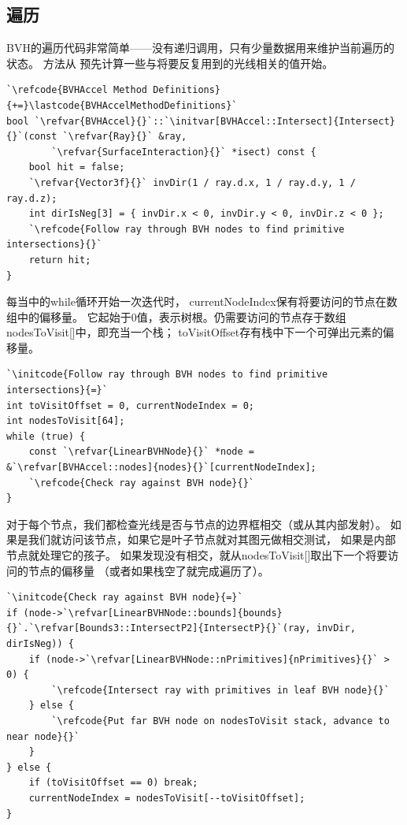 \subsection{遍历}\label{sub:遍历}
BVH的遍历代码非常简单——没有递归调用，只有少量数据用来维护当前遍历的状态。
方法从
预先计算一些与将要反复用到的光线相关的值开始。
\begin{lstlisting}
`\refcode{BVHAccel Method Definitions}{+=}\lastcode{BVHAccelMethodDefinitions}`
bool `\refvar{BVHAccel}{}`::`\initvar[BVHAccel::Intersect]{Intersect}{}`(const `\refvar{Ray}{}` &ray,
        `\refvar{SurfaceInteraction}{}` *isect) const {
    bool hit = false;
    `\refvar{Vector3f}{}` invDir(1 / ray.d.x, 1 / ray.d.y, 1 / ray.d.z);
    int dirIsNeg[3] = { invDir.x < 0, invDir.y < 0, invDir.z < 0 };
    `\refcode{Follow ray through BVH nodes to find primitive intersections}{}`
    return hit;
}
\end{lstlisting}

每当中的{\ttfamily while}循环开始一次迭代时，
{\ttfamily currentNodeIndex}保有将要访问的节点在数组中的偏移量。
它起始于0值，表示树根。仍需要访问的节点存于数组{\ttfamily nodesToVisit[]}中，即充当一个栈；
{\ttfamily toVisitOffset}存有栈中下一个可弹出元素的偏移量。
\begin{lstlisting}
`\initcode{Follow ray through BVH nodes to find primitive intersections}{=}`
int toVisitOffset = 0, currentNodeIndex = 0;
int nodesToVisit[64];
while (true) {
    const `\refvar{LinearBVHNode}{}` *node = &`\refvar[BVHAccel::nodes]{nodes}{}`[currentNodeIndex];
    `\refcode{Check ray against BVH node}{}`
}
\end{lstlisting}

对于每个节点，我们都检查光线是否与节点的边界框相交（或从其内部发射）。
如果是我们就访问该节点，如果它是叶子节点就对其图元做相交测试，
如果是内部节点就处理它的孩子。
如果发现没有相交，就从{\ttfamily nodesToVisit[]}取出下一个将要访问的节点的偏移量
（或者如果栈空了就完成遍历了）。
\begin{lstlisting}
`\initcode{Check ray against BVH node}{=}`
if (node->`\refvar[LinearBVHNode::bounds]{bounds}{}`.`\refvar[Bounds3::IntersectP2]{IntersectP}{}`(ray, invDir, dirIsNeg)) {
    if (node->`\refvar[LinearBVHNode::nPrimitives]{nPrimitives}{}` > 0) {
        `\refcode{Intersect ray with primitives in leaf BVH node}{}`
    } else {
        `\refcode{Put far BVH node on nodesToVisit stack, advance to near node}{}`
    }
} else {
    if (toVisitOffset == 0) break;
    currentNodeIndex = nodesToVisit[--toVisitOffset];
}
\end{lstlisting}

